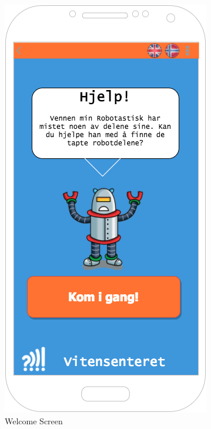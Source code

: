 \begin{figure}[H]
  \begin{minipage}[t]{0.35\textwidth}
    \includegraphics[width=\textwidth]{images/sketches/Welcome.png}
    \caption{Welcome Screen}

\end{minipage}
\end{figure}
